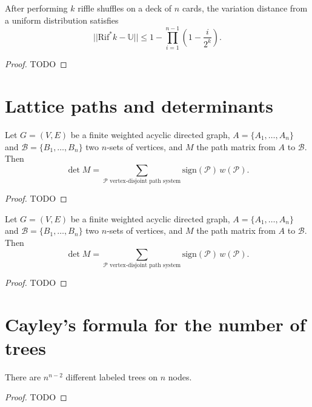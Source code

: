 \begin{theorem}
  \label{ch31theorem2}
  After performing $k$ riffle shuffles on a deck of $n$ cards, the variation distance from a uniform distribution satisfies
\[
||\text{Rif}^*k - \mathbb{U}|| \leq 1 - \prod_{i=1}^{n-1} \left( 1 - \frac{i}{2^k} \right).
\]
\end{theorem}
\begin{proof}
  TODO
\end{proof}


\chapter{Lattice paths and determinants}

\begin{lemma}
  \label{ch32lemma}
  Let $G = (V, E)$ be a finite weighted acyclic directed graph, $A = \{A_1, \dots, A_n\}$ and $\mathcal{B} = \{B_1, \dots, B_n\}$ two $n$-sets of vertices, and $M$ the path matrix from $A$ to $\mathcal{B}$. Then
  \[
  \det M = \sum_{\mathcal{P} \text{ vertex-disjoint path system}} \text{sign}(\mathcal{P}) \, w(\mathcal{P}). \tag{3}
  \]
\end{lemma}
\begin{proof}
  TODO
\end{proof}

\begin{theorem}
  \label{ch32theorem}
  Let $G = (V, E)$ be a finite weighted acyclic directed graph,
  $A = \{A_1, \dots, A_n\}$ and $\mathcal{B} = \{B_1, \dots, B_n\}$
  two $n$-sets of vertices, and $M$ the path matrix from $A$ to $\mathcal{B}$. Then
  \[
  \det M = \sum_{\mathcal{P} \text{ vertex-disjoint path system}} \text{sign}(\mathcal{P}) \, w(\mathcal{P}). \tag{3}
  \]
\end{theorem}
\begin{proof}
  TODO
\end{proof}


\chapter{Cayley's formula for the number of trees}

\begin{theorem}
  \label{cayley_formala_proof1}
  There are $n^{n - 2}$ different labeled trees on $n$ nodes.
\end{theorem}
\begin{proof}
  TODO
\end{proof}


